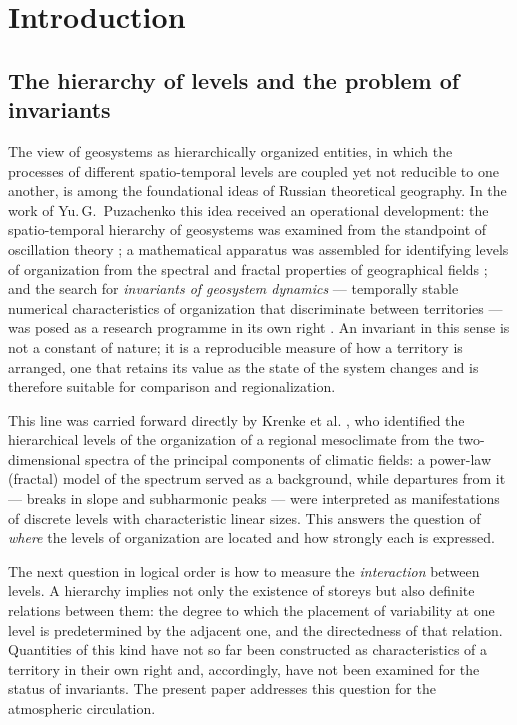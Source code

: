 \documentclass[11pt,a4paper]{article}
\begin{document}
\section{Introduction}
\label{sec:intro}

\subsection{The hierarchy of levels and the problem of invariants}

The view of geosystems as hierarchically organized entities, in which the processes of different spatio-temporal levels are coupled yet not reducible to one another, is among the foundational ideas of Russian theoretical geography. In the work of Yu.\,G.~Puzachenko this idea received an operational development: the spatio-temporal hierarchy of geosystems was examined from the standpoint of oscillation theory \cite{Puzachenko1986}; a mathematical apparatus was assembled for identifying levels of organization from the spectral and fractal properties of geographical fields \cite{Puzachenko2004}; and the search for \emph{invariants of geosystem dynamics} --- temporally stable numerical characteristics of organization that discriminate between territories --- was posed as a research programme in its own right \cite{Puzachenko2010}. An invariant in this sense is not a constant of nature; it is a reproducible measure of how a territory is arranged, one that retains its value as the state of the system changes and is therefore suitable for comparison and regionalization.

This line was carried forward directly by Krenke et al. \cite{Krenke2019}, who identified the hierarchical levels of the organization of a regional mesoclimate from the two-dimensional spectra of the principal components of climatic fields: a power-law (fractal) model of the spectrum served as a background, while departures from it --- breaks in slope and subharmonic peaks --- were interpreted as manifestations of discrete levels with characteristic linear sizes. This answers the question of \emph{where} the levels of organization are located and how strongly each is expressed.

The next question in logical order is how to measure the \emph{interaction} between levels. A hierarchy implies not only the existence of storeys but also definite relations between them: the degree to which the placement of variability at one level is predetermined by the adjacent one, and the directedness of that relation. Quantities of this kind have not so far been constructed as characteristics of a territory in their own right and, accordingly, have not been examined for the status of invariants. The present paper addresses this question for the atmospheric circulation.
\end{document}

